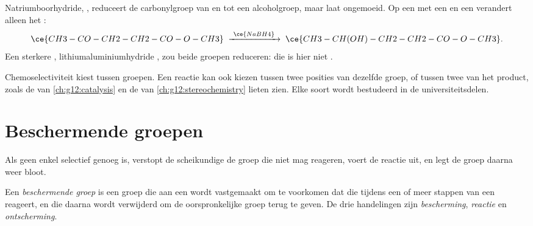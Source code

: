 \begin{example}\label{ex:g12:synthesis-strategy:nabh4}
Natriumboorhydride, , reduceert de carbonylgroep van 
en  tot een alcoholgroep, maar laat  ongemoeid. Op een
 met een  en een  verandert alleen het :
\[
  \ce{CH3-CO-CH2-CH2-CO-O-CH3}
  \;\xrightarrow{\ \ce{NaBH4}\ }\;
  \ce{CH3-CH(OH)-CH2-CH2-CO-O-CH3} .
\]
Een sterkere , lithiumaluminiumhydride , zou beide
groepen reduceren: die is hier niet .
\end{example}

\begin{remark}\label{rem:g12:synthesis-strategy:kinds}
Chemoselectiviteit kiest tussen groepen. Een reactie kan ook kiezen
tussen twee posities van dezelfde groep, of tussen twee 
van het product, zoals de  van \cref{ch:g12:catalysis} en de
  van \cref{ch:g12:stereochemistry} lieten zien. Elke
soort wordt bestudeerd in de universiteitsdelen.
\end{remark}

\section{Beschermende groepen}

Als geen enkel  selectief genoeg is, verstopt de scheikundige de
groep die niet mag reageren, voert de reactie uit, en legt de groep daarna
weer bloot.

\begin{definition}\label{def:g12:synthesis-strategy:protecting-group}
Een \emph{beschermende groep} is een groep die
aan een  wordt vastgemaakt om te voorkomen dat die
tijdens een of meer stappen van een  reageert, en die daarna
wordt verwijderd om de oorspronkelijke groep terug te geven. De drie
handelingen zijn \emph{bescherming}, \emph{reactie} en
\emph{ontscherming}.
\end{definition}


